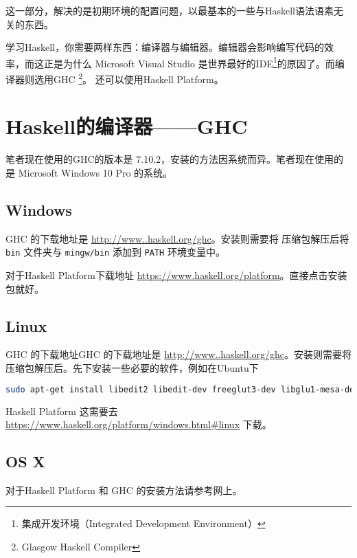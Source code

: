 
\aheadInfo

\documentBegin
{}
这一部分，解决的是初期环境的配置问题，以最基本的一些与Haskell语法语素无关的东西。

学习Haskell，你需要两样东西：编译器与编辑器。编辑器会影响编写代码的效率，而这正是为什么 Microsoft Visual Studio 是世界最好的IDE\footnote{集成开发环境（Integrated Development Environment）}的原因了。而编译器则选用GHC \footnote{Glasgow Haskell Compiler}。
还可以使用Haskell Platform。
\section{Haskell的编译器——GHC}
笔者现在使用的GHC的版本是 7.10.2，安装的方法因系统而异。笔者现在使用的是 Microsoft Windows 10 Pro 的系统。
\subsection{Windows}
GHC 的下载地址是 \url{http://www..haskell.org/ghc}。安装则需要将 压缩包解压后将 \verb"bin" 文件夹与 \verb"mingw/bin" 添加到 \verb"PATH" 环境变量中。

对于Haskell Platform下载地址 \url{https://www.haskell.org/platform}。直接点击安装包就好。
\subsection{Linux}
GHC 的下载地址GHC 的下载地址是 \url{http://www..haskell.org/ghc}。安装则需要将压缩包解压后。先下安装一些必要的软件，例如在Ubuntu下
\begin{lstlisting}[language=bash]
	sudo apt-get install libedit2 libedit-dev freeglut3-dev libglu1-mesa-dev libgmp3-dev
\end{lstlisting}
Haskell Platform 这需要去 \url{https://www.haskell.org/platform/windows.html#linux} 下载。
\subsection{OS X}
对于Haskell Platform 和 GHC 的安装方法请参考网上。

